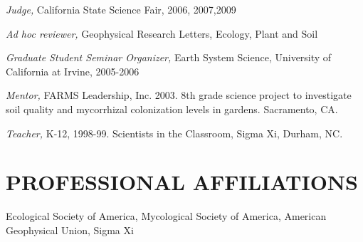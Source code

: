 \documentclass[line]{res}
\begin{document}
\begin{resume}
{\sl Judge,} California State Science Fair, 2006, 2007,2009

{\sl  Ad hoc reviewer,} Geophysical Research Letters, Ecology, Plant and Soil

{\sl Graduate Student Seminar Organizer,} Earth System Science, University of California at Irvine, 2005-2006

{\sl Mentor,} FARMS Leadership, Inc. 2003. 8th grade science project to investigate soil quality and mycorrhizal colonization levels in gardens. Sacramento, CA.

{\sl  Teacher,} K-12, 1998-99. Scientists 
in the Classroom, Sigma Xi, Durham, NC.

\section{PROFESSIONAL AFFILIATIONS} Ecological Society of America, Mycological Society of America, American Geophysical Union, Sigma Xi

\end{resume}
\end{document}
